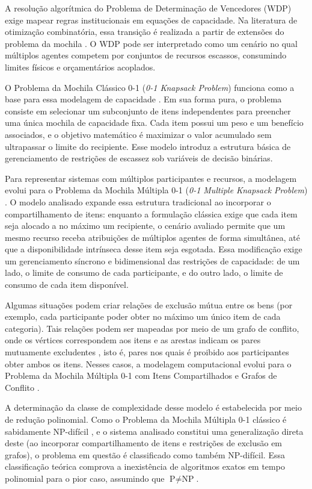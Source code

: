 \documentclass[
    12pt,
    openany,
    oneside,
    a4paper,
    english,
    brazil
]{abntex2}
\begin{document}
A resolução algorítmica do Problema de Determinação de Vencedores (WDP) exige mapear regras institucionais em equações de capacidade. Na literatura de otimização combinatória, essa transição é realizada a partir de extensões do problema da mochila \cite{kellerer2004}. O WDP pode ser interpretado como um cenário no qual múltiplos agentes competem por conjuntos de recursos escassos, consumindo limites físicos e orçamentários acoplados.

O Problema da Mochila Clássico 0-1 (\textit{0-1 Knapsack Problem}) funciona como a base para essa modelagem de capacidade \cite{kellerer2004}. Em sua forma pura, o problema consiste em selecionar um subconjunto de itens independentes para preencher uma única mochila de capacidade fixa. Cada item possui um peso e um benefício associados, e o objetivo matemático é maximizar o valor acumulado sem ultrapassar o limite do recipiente. Esse modelo introduz a estrutura básica de gerenciamento de restrições de escassez sob variáveis de decisão binárias.

Para representar sistemas com múltiplos participantes e recursos, a modelagem evolui para o Problema da Mochila Múltipla 0-1 (\textit{0-1 Multiple Knapsack Problem}) \cite{kellerer2004}. O modelo analisado expande essa estrutura tradicional ao incorporar o compartilhamento de itens: enquanto a formulação clássica exige que cada item seja alocado a no máximo um recipiente, o cenário avaliado permite que um mesmo recurso receba atribuições de múltiplos agentes de forma simultânea, até que a disponibilidade intrínseca desse item seja esgotada. Essa modificação exige um gerenciamento síncrono e bidimensional das restrições de capacidade: de um lado, o limite de consumo de cada participante, e do outro lado, o limite de consumo de cada item disponível.

Algumas situações podem criar relações de exclusão mútua entre os bens (por exemplo, cada participante poder obter no máximo um único item de cada categoria). Tais relações podem ser mapeadas por meio de um grafo de conflito, onde os vértices correspondem aos itens e as arestas indicam os pares mutuamente excludentes \cite{kellerer2004}, isto é, pares nos quais é proibido aos participantes obter ambos os itens. Nesses casos, a modelagem computacional evolui para o Problema da Mochila Múltipla 0-1 com Itens Compartilhados e Grafos de Conflito \cite{kellerer2004}.

A determinação da classe de complexidade desse modelo é estabelecida por meio de redução polinomial. Como o Problema da Mochila Múltipla 0-1 clássico é sabidamente NP-difícil \cite{kellerer2004}, e o sistema analisado constitui uma generalização direta deste (ao incorporar compartilhamento de itens e restrições de exclusão em grafos), o problema em questão é classificado como também NP-difícil. Essa classificação teórica comprova a inexistência de algoritmos exatos em tempo polinomial para o pior caso, assumindo que $\text{P} \neq \text{NP}$.
\end{document}
